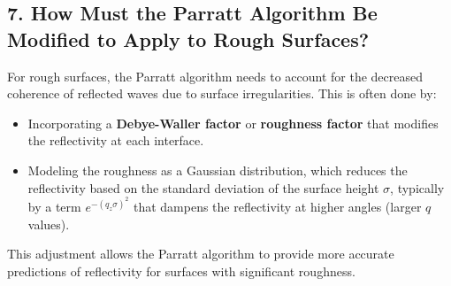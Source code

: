 \documentclass[a4paper,12pt]{article}
\begin{document}
\subsection*{7. How Must the Parratt Algorithm Be Modified to Apply to Rough Surfaces?}
For rough surfaces, the Parratt algorithm needs to account for the decreased coherence of reflected waves due to surface irregularities. This is often done by:
\begin{itemize}
    \item Incorporating a \textbf{Debye-Waller factor} or \textbf{roughness factor} that modifies the reflectivity at each interface.
    \item Modeling the roughness as a Gaussian distribution, which reduces the reflectivity based on the standard deviation of the surface height \( \sigma \), typically by a term \( e^{-(q_z \sigma)^2} \) that dampens the reflectivity at higher angles (larger \( q \) values).
\end{itemize}
This adjustment allows the Parratt algorithm to provide more accurate predictions of reflectivity for surfaces with significant roughness.
\end{document}
